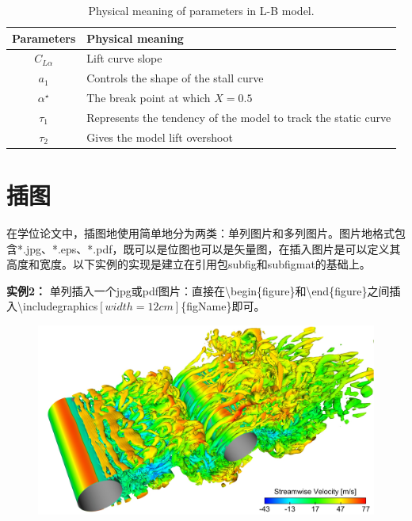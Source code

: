 \begin{table}[htb]               %
\centering
 \begin{center}
  \caption{Physical meaning of parameters in L-B model.}
  \label{tab:LB-parameters}
  \begin{tabular}{cl}
      \toprule
       Parameters & Physical meaning       \\
      \midrule   %
       $C_{L\alpha}$ & Lift curve slope \\
       $a_{1}$ & Controls the shape of the stall curve \\
       $\alpha^{\star}$ & The break point at which $X=0.5$ \\
       $\tau_{1}$ & Represents the tendency of the model to track the static curve \\
       $\tau_{2}$ & Gives the model lift overshoot \\
      \bottomrule
  \end{tabular}
 \end{center}
\end{table}

\section{插图}
\label{sec:fig}

在学位论文中，插图地使用简单地分为两类：单列图片和多列图片。图片地格式包含*.jpg、*.eps、*.pdf，既可以是位图也可以是矢量图，在插入图片是可以定义其高度和宽度。以下实例的实现是建立在引用包subfig和subfigmat的基础上。

{\bf{实例2：}} 单列插入一个jpg或pdf图片：直接在\textbackslash begin\{figure\}和\textbackslash end\{figure\}之间插入\textbackslash includegraphics$\left[width=12cm\right]$\{figName\}即可。

\begin{figure}[htb]
\centering
   \includegraphics[width=12cm]{./img/visual_jpg}
  \label{fig:visual}
\end{figure}

